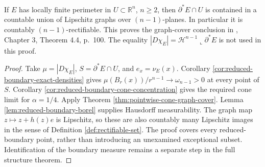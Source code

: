 \begin{theorem}\label{thm:reduced-boundary-graph-cover}
If $E$ has locally finite perimeter in $U\subset\mathbb R^n$, $n\geq2$, then $\partial^*E\cap U$ is contained in a countable union of Lipschitz graphs over $(n-1)$-planes. In particular it is countably $(n-1)$-rectifiable. This proves the graph-cover conclusion in \cite{Sim18}, Chapter 3, Theorem 4.4, p.~100. The equality $|D\chi_E|=\mathcal H^{n-1}\llcorner\partial^*E$ is not used in this proof.
\end{theorem}
\begin{proof}
Take $\mu=|D\chi_E|$, $S=\partial^*E\cap U$, and $e_x=\nu_E(x)$. Corollary \ref{cor:reduced-boundary-exact-densities} gives $\mu(B_r(x))/r^{n-1}\to\omega_{n-1}>0$ at every point of $S$. Corollary \ref{cor:reduced-boundary-cone-concentration} gives the required cone limit for $\alpha=1/4$. Apply Theorem \ref{thm:pointwise-cone-graph-cover}. Lemma \ref{lem:reduced-boundary-borel} supplies Hausdorff measurability. The graph map $z\mapsto z+h(z)e$ is Lipschitz, so these are also countably many Lipschitz images in the sense of Definition \ref{def:rectifiable-set}. The proof covers every reduced-boundary point, rather than introducing an unexamined exceptional subset. Identification of the boundary measure remains a separate step in the full structure theorem.
\end{proof}
